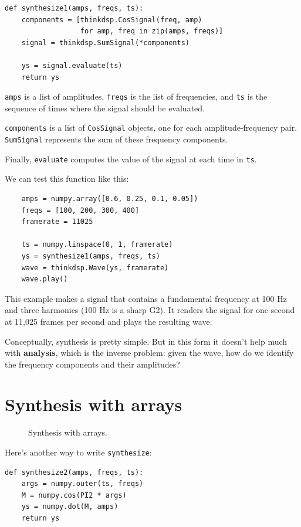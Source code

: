 \documentclass[12pt]{book}
\begin{document}
\begin{verbatim}
def synthesize1(amps, freqs, ts):
    components = [thinkdsp.CosSignal(freq, amp)
                  for amp, freq in zip(amps, freqs)]
    signal = thinkdsp.SumSignal(*components)

    ys = signal.evaluate(ts)
    return ys
\end{verbatim}

{\tt amps} is a list of amplitudes, {\tt freqs} is the list
of frequencies, and {\tt ts} is the sequence
of times where the signal should be evaluated.

{\tt components} is a list of {\tt CosSignal} objects, one for
each amplitude-frequency pair.  {\tt SumSignal} represents the
sum of these frequency components.

Finally, {\tt evaluate} computes the value of the signal at each
time in {\tt ts}.

We can test this function like this:

\begin{verbatim}
    amps = numpy.array([0.6, 0.25, 0.1, 0.05])
    freqs = [100, 200, 300, 400]
    framerate = 11025

    ts = numpy.linspace(0, 1, framerate)
    ys = synthesize1(amps, freqs, ts)
    wave = thinkdsp.Wave(ys, framerate)
    wave.play()
\end{verbatim}

This example makes a signal that contains a fundamental frequency at
100 Hz and three harmonics (100 Hz is a sharp G2).  It renders the
signal for one second at 11,025 frames per second and plays the
resulting wave.

Conceptually, synthesis is pretty simple.  But in this form it doesn't
help much with {\bf analysis}, which is the inverse problem: given the
wave, how do we identify the frequency components and their amplitudes?


\section{Synthesis with arrays}
\label{synthesis}

\begin{figure}

\caption{Synthesis with arrays.}
\label{fig.synthesis}
\end{figure}

Here's another way to write {\tt synthesize}:

\begin{verbatim}
def synthesize2(amps, freqs, ts):
    args = numpy.outer(ts, freqs)
    M = numpy.cos(PI2 * args)
    ys = numpy.dot(M, amps)
    return ys
\end{verbatim}
\end{document}
